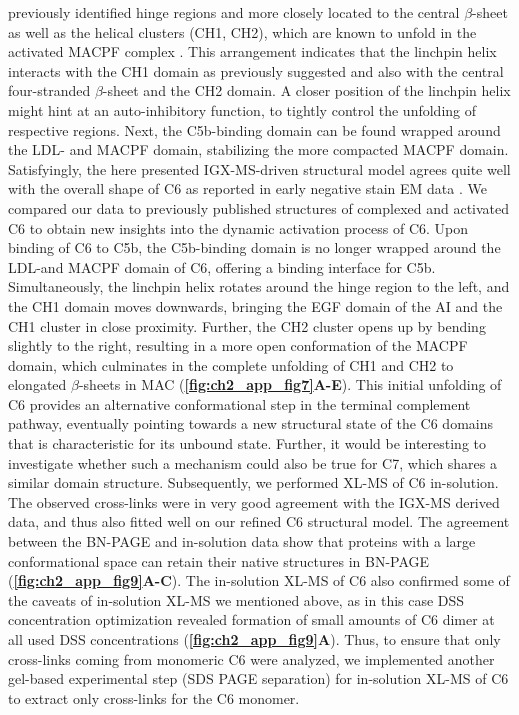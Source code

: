 previously identified hinge regions \cite{Aleshin_2012} and more closely located to the central $\beta$-sheet as well as the helical clusters (CH1, CH2), which are known to unfold in the activated MACPF complex \cite{Menny_2018}. This arrangement indicates that the linchpin helix interacts with the CH1 domain as previously suggested \cite{Aleshin_2012} and also with the central four-stranded $\beta$-sheet and the CH2 domain. A closer position of the linchpin helix might hint at an auto-inhibitory function, to tightly control the unfolding of respective regions. Next, the C5b-binding domain can be found wrapped around the LDL- and MACPF domain, stabilizing the more compacted MACPF domain. Satisfyingly, the here presented IGX-MS-driven structural model agrees quite well with the overall shape of C6 as reported in early negative stain EM data \cite{DiScipio_1989}. We compared our data to previously published structures of complexed and activated C6 to obtain new insights into the dynamic activation process of C6. Upon binding of C6 to C5b, the C5b-binding domain is no longer wrapped around the LDL-and MACPF domain of C6, offering a binding interface for C5b. Simultaneously, the linchpin helix rotates around the hinge region to the left, and the CH1 domain moves downwards, bringing the EGF domain of the AI and the CH1 cluster in close proximity. Further, the CH2 cluster opens up by bending slightly to the right, resulting in a more open conformation of the MACPF domain, which culminates in the complete unfolding of CH1 and CH2 to elongated $\beta$-sheets in MAC (\textbf{\autoref{fig:ch2_app_fig7}A-E}). This initial unfolding of C6 provides an alternative conformational step in the terminal complement pathway, eventually pointing towards a new structural state of the C6 domains that is characteristic for its unbound state. Further, it would be interesting to investigate whether such a mechanism could also be true for C7, which shares a similar domain structure. Subsequently, we performed XL-MS of C6 in-solution. The observed cross-links were in very good agreement with the IGX-MS derived data, and thus also fitted well on our refined C6 structural model. The agreement between the BN-PAGE and in-solution data show that proteins with a large conformational space can retain their native structures in BN-PAGE (\textbf{\autoref{fig:ch2_app_fig9}A-C}). The in-solution XL-MS of C6 also confirmed some of the caveats of in-solution XL-MS we mentioned above, as in this case DSS concentration optimization revealed formation of small amounts of C6 dimer at all used DSS concentrations (\textbf{\autoref{fig:ch2_app_fig9}A}). Thus, to ensure that only cross-links coming from monomeric C6 were analyzed, we implemented another gel-based experimental step (SDS PAGE separation) for in-solution XL-MS of C6 to extract only cross-links for the C6 monomer.\\
